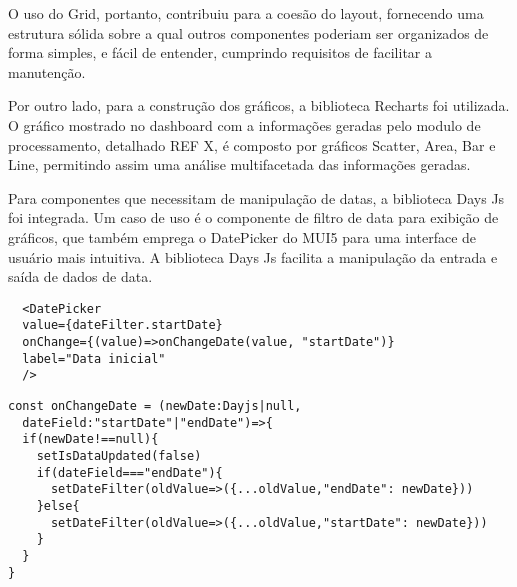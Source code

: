 O uso do Grid, portanto, contribuiu para a coesão do layout, fornecendo uma estrutura sólida sobre a qual outros componentes poderiam ser organizados de forma simples, e fácil de entender, cumprindo requisitos de facilitar a manutenção.%

Por outro lado, para a construção dos gráficos, a biblioteca Recharts foi utilizada. O gráfico mostrado no dashboard com a informações geradas pelo modulo de processamento, detalhado REF X, é composto por gráficos Scatter, Area, Bar e Line, permitindo assim uma análise multifacetada das informações geradas. 

Para componentes que necessitam de manipulação de datas, a biblioteca Days Js foi integrada. Um caso de uso é o componente de filtro de data para exibição de gráficos, que também emprega o DatePicker do \gls{MUI5} para uma interface de usuário mais intuitiva. A biblioteca Days Js facilita a manipulação da entrada e saída de dados de data.

\begin{verbatim}
  <DatePicker
  value={dateFilter.startDate}
  onChange={(value)=>onChangeDate(value, "startDate")}
  label="Data inicial"
  />
\end{verbatim}

\begin{verbatim}
const onChangeDate = (newDate:Dayjs|null, 
  dateField:"startDate"|"endDate")=>{
  if(newDate!==null){
    setIsDataUpdated(false)
    if(dateField==="endDate"){
      setDateFilter(oldValue=>({...oldValue,"endDate": newDate}))
    }else{
      setDateFilter(oldValue=>({...oldValue,"startDate": newDate}))
    }
  }
}
\end{verbatim}


